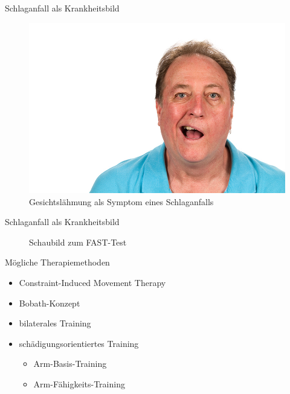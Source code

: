 \documentclass[hyphens]{beamer}
\begin{document}
\begin{frame}{Schlaganfall als Krankheitsbild}
\begin{figure}
	\includegraphics[scale=1.1]{pics/laehm}
	\caption{Gesichtslähmung als Symptom eines Schlaganfalls}
\end{figure}
\end{frame}

\begin{frame}{Schlaganfall als Krankheitsbild}
\begin{figure}
	
	\caption{Schaubild zum FAST-Test}
\end{figure}
\end{frame}

\begin{frame}{Mögliche Therapiemethoden}
	\begin{itemize}[<+->]
		\item Constraint-Induced Movement Therapy
		\item Bobath-Konzept
		\item bilaterales Training
		\item schädigungsorientiertes Training
		\begin{itemize}
			\item Arm-Basis-Training
			\item Arm-Fähigkeits-Training
		\end{itemize}
	\end{itemize}
\end{frame}
\end{document}
